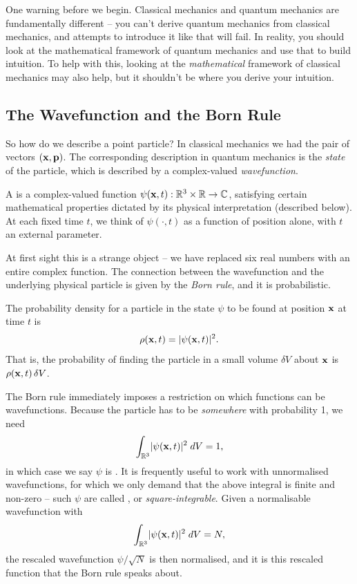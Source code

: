 \documentclass[a4paper]{scrartcl}
\begin{document}
One warning before we begin. Classical mechanics and quantum mechanics are fundamentally different -- you can't derive quantum mechanics from classical mechanics, and attempts to introduce it like that will fail. In reality, you should look at the mathematical framework of quantum mechanics and use that to build intuition. To help with this, looking at the \emph{mathematical} framework of classical mechanics may also help, but it shouldn't be where you derive your intuition.

\subsection{The Wavefunction and the Born Rule}

So how do we describe a point particle? In classical mechanics we had the pair of vectors $(\mathbf{x}, \mathbf{p})$. The corresponding description in quantum mechanics is the \emph{state} of the particle, which is described by a complex-valued \emph{wavefunction}.

\begin{definition}[Wavefunction]
    A  is a complex-valued function $\psi(\mathbf{x}, t): \mathbb{R}^3 \times \mathbb{R} \rightarrow \mathbb{C}$, satisfying certain mathematical properties dictated by its physical interpretation (described below). At each fixed time $t$, we think of $\psi(\cdot, t)$ as a function of position alone, with $t$ an external parameter.
\end{definition}

At first sight this is a strange object -- we have replaced six real numbers with an entire complex function. The connection between the wavefunction and the underlying physical particle is given by the \emph{Born rule}, and it is probabilistic.

\begin{axiom}
    The probability density for a particle in the state $\psi$ to be found at position $\mathbf{x}$ at time $t$ is
    $$
    \rho(\mathbf{x}, t) = \lvert\psi(\mathbf{x}, t)\rvert^2.
    $$
    That is, the probability of finding the particle in a small volume $\delta V$ about $\mathbf{x}$ is $\rho(\mathbf{x}, t) \, \delta V$.
\end{axiom}

The Born rule immediately imposes a restriction on which functions can be wavefunctions. Because the particle has to be \emph{somewhere} with probability 1, we need
$$
\int_{\mathbb{R}^3} \lvert\psi(\mathbf{x}, t)\rvert^2 \; d V = 1,
$$
in which case we say $\psi$ is . It is frequently useful to work with unnormalised wavefunctions, for which we only demand that the above integral is finite and non-zero -- such $\psi$ are called , or \emph{square-integrable}. Given a normalisable wavefunction with
$$
\int_{\mathbb{R}^3} \lvert\psi(\mathbf{x}, t)\rvert^2 \; d V = N,
$$
the rescaled wavefunction $\psi / \sqrt{N}$ is then normalised, and it is this rescaled function that the Born rule speaks about.
\end{document}
